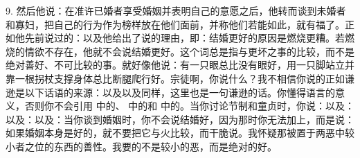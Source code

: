 9. 然后他说：在准许已婚者享受婚姻并表明自己的意愿之后，他转而谈到未婚者和寡妇，把自己的行为作为榜样放在他们面前，并称他们若能如此，就有福了。正如他先前说过的：以及他给出了说的理由，即：结婚更好的原因是燃烧更糟。若燃烧的情欲不存在，他就不会说结婚更好。这个词总是指与更坏之事的比较，而不是绝对善好、不可比较的事。就好像他说：有一只眼总比没有眼好，用一只脚站立并靠一根拐杖支撑身体总比断腿爬行好。宗徒啊，你说什么？我不相信你说的正如谦逊是以下话语的来源：以及以及同样，这里也是一句谦逊的话。你懂得语言的意义，否则你不会引用 中的、 中的和 中的。当你讨论节制和童贞时，你说：以及：以及：以及：当你谈到婚姻时，你不会说结婚好，因为那时你无法加上，而是说：如果婚姻本身是好的，就不要把它与火比较，而干脆说。我怀疑那被置于两恶中较小者之位的东西的善性。我要的不是较小的恶，而是绝对的好。\par

